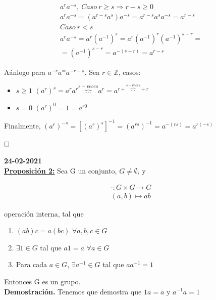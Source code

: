 \documentclass{article}
\begin{document}
\begin{enumerate}
\begin{gather*}
a^ra^{-s}, \> Caso \> r\geq s \Rightarrow r-s \geq 0 \\
a^ra^{-s}=(a^{r-s}a^s)a^{-s}=a^{r-s}a^sa^{-s}=a^{r-s} \\
Caso \> r < s \\
a^ra^{-s}=a^r(a^{-1})^s=a^r(a^{-1})^r(a^{-1})^{s-r} = \\
=(a^{-1})^{s-r}=a^{-(s-r)}=a^{r-s}
\end{gather*}

Aánlogo para $a^{-r}a^=a^{-r+s}$. Sea $r \in \mathbb{Z}$, casos:

\begin{itemize}
\item $s \geq 1$ $(a^r)^s=a^ra^r\overbrace{\ldots}^{s-veces}a^r=a^{r+\overbrace{\ldots}^{s-veces}+r}$

\item $s=0$ $(a^r)^0=1=a^{r0}$
\end{itemize}

Finalmente, $(a^r)^{-s}=[(a^r)^s]^{-1}=(a^{rs})^{-1}=a^{-(rs)}=a^{r(-s)}$
\end{enumerate}

$\hfill\square$

\textbf{24-02-2021} \\

\underline{\textbf{Proposición 2:}} Sea G un conjunto, $G\neq \emptyset$, y 

\begin{equation*}
\begin{split}
\cdot : G\times G \rightarrow G \\
(a,b)\mapsto ab
\end{split}
\end{equation*}

operación interna, tal que

\begin{enumerate}
\item $(ab)c=a(bc)$ $\forall a,b,c\in G$
\item $\exists 1 \in G$ tal que $a1=a$ $\forall a \in G$ 
\item Para cada $a \in G$, $\exists a^{-1} \in G$ tal que $aa^{-1}=1$
\end{enumerate}

Entonces G es un grupo. \\

\textbf{Demostración.} Tenemos que demostra que $1a=a$ y $a^{-1}a=1$ \\
\end{document}
